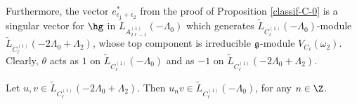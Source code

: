 \documentclass[pdftex]{sigma}
\begin{document}
Furthermore, the vector $ e_{\epsilon _{1}+ \epsilon _{2}} ^*$ from
the proof of Proposition \ref{classif-C-0} is a singular vector for
${\hg}$  in $\widetilde{L}_{A_{2 \ell -1} ^{(1)}} (-\Lambda_0)$
which generates $\widetilde{L}_{C_{ \ell} ^{(1)}}
(-\Lambda_0)$-module $\widetilde{L}_{C_{\ell} ^{(1)}} (-2\Lambda_0
+ \Lambda_2)$, whose top component is irreducible $\frak g$-module
$V_{C_{\ell}}(\omega _2)$. Clearly, $\theta$ acts as $1$ on
$\widetilde{L}_{C_{\ell} ^{(1)}} (-\Lambda_0)$ and as $-1$ on
$\widetilde{L}_{C_{\ell} ^{(1)}} (-2\Lambda_0 + \Lambda_2)$.

\begin{lemma} \label{lem-ext}
Let $u,v \in \widetilde{L}_{C_{\ell} ^{(1)}} (-2\Lambda_0 +
\Lambda_2)$. Then $u_n v \in \widetilde{L}_{C_{\ell} ^{(1)}}
(-\Lambda_0)$, for any $n \in \Z$.
\end{lemma}
\end{document}
